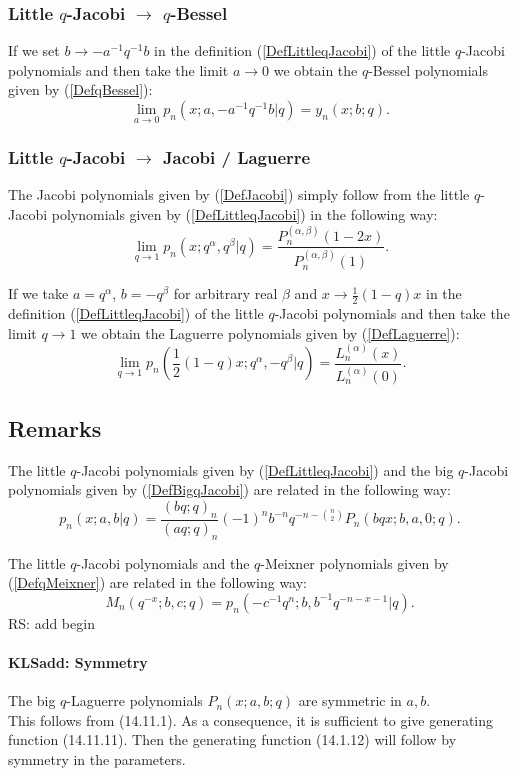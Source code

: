 \documentclass[envcountchap,graybox]{svmono}
\newcounter{rom}
\newcommand\sa{\smallskipamount}
\newcommand\sLP{\\[\sa]}
\begin{document}
\subsubsection*{Little $q$-Jacobi $\rightarrow$ $q$-Bessel}
If we set $b\rightarrow -a^{-1}q^{-1}b$ in the definition (\ref{DefLittleqJacobi}) of
the little $q$-Jacobi polynomials and then take the limit $a\rightarrow 0$ we obtain
the $q$-Bessel polynomials given by (\ref{DefqBessel}):
\begin{equation}
\lim_{a\rightarrow 0}p_n(x;a,-a^{-1}q^{-1}b|q)=y_n(x;b;q).
\end{equation}

\subsubsection*{Little $q$-Jacobi $\rightarrow$ Jacobi / Laguerre}
The Jacobi polynomials given by (\ref{DefJacobi}) simply follow from
the little $q$-Jacobi polynomials given by (\ref{DefLittleqJacobi}) in the following way:
\begin{equation}
\lim_{q\rightarrow 1}p_n(x;q^{\alpha},q^{\beta}|q)=\frac{P_n^{(\alpha,\beta)}(1-2x)}
{P_n^{(\alpha,\beta)}(1)}.
\end{equation}

If we take $a=q^{\alpha}$, $b=-q^{\beta}$ for arbitrary real $\beta$ and
$x\rightarrow\frac{1}{2}(1-q)x$ in the definition (\ref{DefLittleqJacobi})
of the little $q$-Jacobi polynomials and then take the limit $q\rightarrow 1$
we obtain the Laguerre polynomials given by (\ref{DefLaguerre}):
\begin{equation}
\lim_{q\rightarrow 1}p_n(\textstyle\frac{1}{2}(1-q)x;q^{\alpha},-q^{\beta}|q)
=\frac{L_n^{(\alpha)}(x)}{L_n^{(\alpha)}(0)}.
\end{equation}

\subsection*{Remarks} 
The little $q$-Jacobi polynomials given by
(\ref{DefLittleqJacobi}) and the big $q$-Jacobi polynomials given by
(\ref{DefBigqJacobi}) are related in the following way:
$$p_n(x;a,b|q)=\frac{(bq;q)_n}{(aq;q)_n}(-1)^nb^{-n}q^{-n-\binom{n}{2}}
P_n(bqx;b,a,0;q).$$

\noindent
The little $q$-Jacobi polynomials and the $q$-Meixner polynomials given by (\ref{DefqMeixner})
are related in the following way:
$$M_n(q^{-x};b,c;q)=p_n(-c^{-1}q^n;b,b^{-1}q^{-n-x-1}|q).$$
 RS: add begin\label{sec14.11}
%
\paragraph{\large\bf KLSadd: Symmetry}The big $q$-Laguerre polynomials $P_n(x;a,b;q)$ are symmetric in $a,b$.
\sLP
This follows from (14.11.1).
As a consequence, it is sufficient to give generating function (14.11.11). Then the generating
function (14.1.12) will follow by symmetry in the parameters.
%
\end{document}
